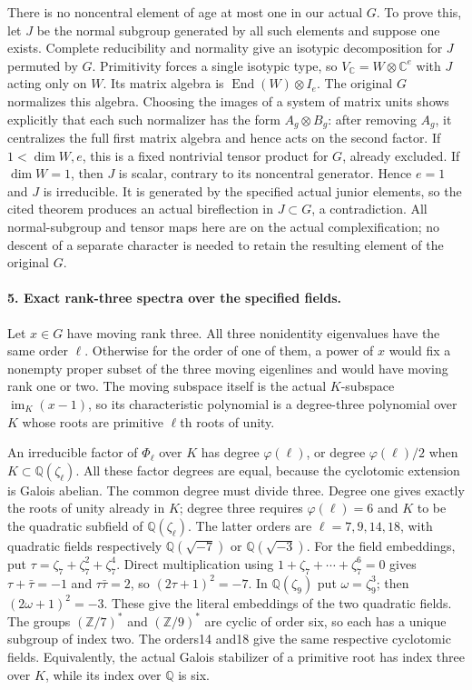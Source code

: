 There is no noncentral element of age at most one in our actual
$G$.  To prove this, let $J$ be the normal subgroup generated by
all such elements and suppose one exists.  Complete reducibility
and normality give an isotypic decomposition for $J$ permuted by
$G$.  Primitivity forces a single isotypic type, so
$V_{\mathbb C}=W\otimes\mathbb C^e$ with $J$ acting only on
$W$.  Its matrix algebra is $\operatorname{End}(W)\otimes I_e$.
The original $G$ normalizes this algebra.  Choosing the images
of a system of matrix units shows explicitly that each such
normalizer has the form $A_g\otimes B_g$: after removing
$A_g$, it centralizes the full first matrix algebra and hence
acts on the second factor.  If $1<\dim W,e$, this is a fixed
nontrivial tensor product for $G$, already excluded.  If
$\dim W=1$, then $J$ is scalar, contrary to its noncentral
generator.  Hence $e=1$ and $J$ is irreducible.  It is generated
by the specified actual junior elements, so the cited theorem
produces an actual bireflection in $J\subset G$, a contradiction.
All normal-subgroup and tensor maps here are on the actual
complexification; no descent of a separate character is needed
to retain the resulting element of the original $G$.

\paragraph{5. Exact rank-three spectra over the specified fields.}
Let $x\in G$ have moving rank three.  All three nonidentity
eigenvalues have the same order $\ell$.  Otherwise for the
order of one of them, a power of $x$ would fix a nonempty proper
subset of the three moving eigenlines and would have moving rank
one or two.  The moving subspace itself is the actual
$K$-subspace $\operatorname{im}_K(x-1)$, so its characteristic
polynomial is a degree-three polynomial over $K$ whose roots
are primitive $\ell$th roots of unity.

An irreducible factor of $\Phi_\ell$ over $K$ has degree
$\varphi(\ell)$, or degree $\varphi(\ell)/2$ when
$K\subset\mathbb Q(\zeta_\ell)$.  All these factor degrees
are equal, because the cyclotomic extension is Galois abelian.
The common degree must divide three.  Degree one gives exactly
the roots of unity already in $K$; degree three requires
$\varphi(\ell)=6$ and $K$ to be the quadratic subfield of
$\mathbb Q(\zeta_\ell)$.  The latter orders are
$\ell=7,9,14,18$, with quadratic fields respectively
$\mathbb Q(\sqrt{-7})$ or $\mathbb Q(\sqrt{-3})$.
For the field embeddings, put
$\tau=\zeta_7+\zeta_7^2+\zeta_7^4$.  Direct multiplication
using $1+\zeta_7+\cdots+\zeta_7^6=0$ gives
$\tau+\bar\tau=-1$ and $\tau\bar\tau=2$, so
$(2\tau+1)^2=-7$.  In $\mathbb Q(\zeta_9)$ put
$\omega=\zeta_9^3$; then $(2\omega+1)^2=-3$.
These give the literal embeddings of the two quadratic fields.
The groups $(\mathbb Z/7)^*$ and $(\mathbb Z/9)^*$ are
cyclic of order six, so each has a unique subgroup of index two.
The orders14 and18 give the same respective cyclotomic fields.
Equivalently, the actual Galois stabilizer of a primitive root
has index three over $K$, while its index over $\mathbb Q$
is six.

